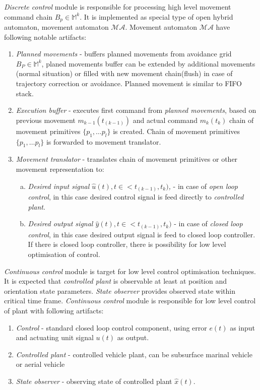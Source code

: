 \noindent \textit{Discrete control} module is responsible for processing high level movement command chain $B_p \in \mathbb{M}^k$. It is implemented as special type of open hybrid automaton, movement automaton $\mathscr{MA}$. Movement automaton $\mathscr{MA}$ have following notable artifacts:
\begin{enumerate}
    \item \textit{Planned movements} - buffers planned movements from avoidance grid $B_P\in\mathbb{M}^k$, planed movements buffer can be extended by additional movements (normal situation) or filled with new movement chain(flush) in case of trajectory correction or avoidance. Planned movement is similar to FIFO stack.
    \item \textit{Execution buffer} - executes first command from \textit{planned movements}, based on previous movement $m_{k-1}(t_{(k-1)})$ and actual command $m_k(t_k)$ chain of movement primitives $\{p_1, \dots p_l\}$ is created. Chain of movement primitives $\{p_1, \dots p_l\}$ is forwarded to movement translator.
    \item \textit{Movement translator} - translates chain of movement primitives or other movement representation to:
    \begin{enumerate}[a.]
        \item \textit{Desired input signal $\hat{u}(t),t\in<t_{(k-1)},t_k)$,} - in case of \textit{open loop control}, in this case desired control signal is feed directly to \textit{controlled plant}.
        \item \textit{Desired output signal $\hat{y}(t),t\in<t_{(k-1)},t_k)$} - in case of \textit{closed loop control}, in this case desired output signal is feed to closed loop controller. If there is closed loop controller, there is possibility for low level optimisation of control.
    \end{enumerate}
\end{enumerate}

\noindent \textit{Continuous control} module is target for low level control optimisation techniques. It is expected that \textit{controlled plant} is observable at least at position and orientation state parameters. \textit{State observer} provides observed state within critical time frame. \textit{Continuous control} module is responsible for low level control of plant with following artifacts:
\begin{enumerate}
    \item \textit{Control} - standard closed loop control component, using error $e(t)$ as input and actuating unit signal $u(t)$ as output.
    \item \textit{Controlled plant} - controlled vehicle plant, can be subsurface marinal vehicle or aerial vehicle
    \item \textit{State observer} - observing state of controlled plant $\hat{x}(t)$.
\end{enumerate}

